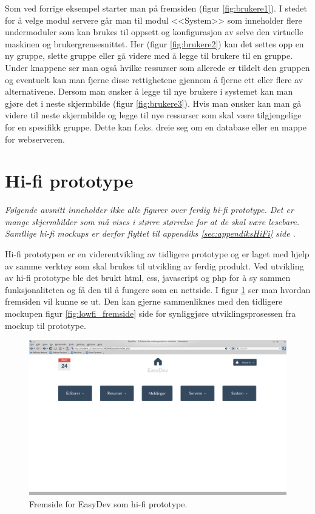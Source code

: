 Som ved forrige eksempel starter  man på fremsiden (figur \ref{fig:brukere1}). I stedet for å velge modul servere går man til modul <<System>> som inneholder flere undermoduler som kan brukes til oppsett og konfigurasjon av selve den virtuelle maskinen og brukergrensesnittet. 
Her (figur \ref{fig:brukere2}) kan det settes opp en ny gruppe, slette gruppe eller gå videre med å legge til brukere til en gruppe. Under knappene ser man også hvilke ressurser som allerede er tildelt den gruppen og eventuelt kan man fjerne disse rettighetene gjennom å fjerne ett eller flere av alternativene.
Dersom man ønsker å legge til nye brukere i systemet kan man gjøre det i neste skjermbilde (figur \ref{fig:brukere3}).
Hvis man ønsker kan man gå videre til neste skjermbilde og legge til nye ressurser som skal være tilgjengelige for en spesifikk gruppe. Dette kan f.eks. dreie seg om en database eller en mappe for webserveren. 

\section{Hi-fi prototype}
\emph{Følgende avsnitt inneholder ikke alle figurer over ferdig hi-fi prototype. Det er mange skjermbilder som må vises i større størrelse for at de skal være lesebare. Samtlige hi-fi mockups er derfor flyttet til appendiks \ref{sec:appendiksHiFi} side \pageref{sec:appendiksHiFi}.}

Hi-fi prototypen er en videreutvikling av tidligere prototype og er laget med hjelp av samme verktøy som skal brukes til utvikling av ferdig produkt. 
Ved utvikling av hi-fi prototype ble det brukt  html, css, javascript og php for å sy sammen funksjonaliteten og få den til å fungere som en nettside. I figur \ref{fig:hifi_fremside} ser man hvordan fremsiden vil kunne se ut. Den kan gjerne sammenliknes med den tidligere mockupen figur \ref{fig:lowfi_fremside} side \pageref{fig:lowfi_fremside} for synliggjøre utviklingsprosessen fra mockup til prototype.
\begin{figure}[ht]
\includegraphics[width=\textwidth,height=\textheight,keepaspectratio]{./img/prosessdokumentasjon/hifi/fremside.png}
\caption[Hi-fi prototype]{Fremside for EasyDev som hi-fi prototype.}
\label{fig:hifi_fremside}
\end{figure}

